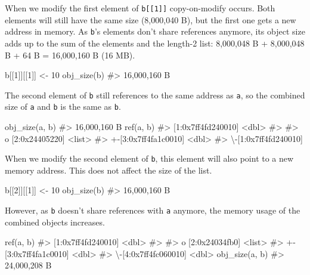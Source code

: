\documentclass[
]{krantz}
\makeatletter
\newenvironment{Shaded}{\begin{snugshade}}{\end{snugshade}}
\newcommand{\CommentTok}[1]{\textcolor[rgb]{0.56,0.35,0.01}{\textit{#1}}}
\newcommand{\DecValTok}[1]{\textcolor[rgb]{0.00,0.00,0.81}{#1}}
\newcommand{\KeywordTok}[1]{\textcolor[rgb]{0.13,0.29,0.53}{\textbf{#1}}}
\newcommand{\NormalTok}[1]{#1}
\newcommand{\StringTok}[1]{\textcolor[rgb]{0.31,0.60,0.02}{#1}}
\newenvironment{kframe}{%
\medskip{}
\setlength{\fboxsep}{.8em}
 \def\at@end@of@kframe{}%
 \ifinner\ifhmode%
  \def\at@end@of@kframe{\end{minipage}}%
  \begin{minipage}{\columnwidth}%
 \fi\fi%
 \def\FrameCommand##1{\hskip\@totalleftmargin \hskip-\fboxsep
 \colorbox{shadecolor}{##1}\hskip-\fboxsep
     \hskip-\linewidth \hskip-\@totalleftmargin \hskip\columnwidth}%
 \MakeFramed {\advance\hsize-\width
   \@totalleftmargin\z@ \linewidth\hsize
   \@setminipage}}%
 {\par\unskip\endMakeFramed%
 \at@end@of@kframe}
\renewenvironment{Shaded}{\begin{kframe}}{\end{kframe}}
\renewcommand{\KeywordTok} [1]{\textcolor[rgb]{0.00,0.44,0.13}{{#1}}}
\renewcommand{\DecValTok}  [1]{\textcolor[rgb]{0.25,0.63,0.44}{{#1}}}
\renewcommand{\StringTok}  [1]{\textcolor[rgb]{0.25,0.44,0.63}{{#1}}}
\renewcommand{\CommentTok} [1]{\textcolor[rgb]{0.38,0.63,0.69}{{#1}}}
\renewcommand{\NormalTok}  [1]{{#1}}
\makeatother
\begin{document}
When we modify the first element of \texttt{b{[}{[}1{]}{]}} copy-on-modify occurs. Both elements will still have the same size (8,000,040 B), but the first one gets a new address in memory. As \texttt{b}'s elements don't share references anymore, its object size adds up to the sum of the elements and the length-2 list: 8,000,048 B + 8,000,048 B + 64 B = 16,000,160 B (16 MB).

\begin{Shaded}
\begin{Highlighting}[]
\NormalTok{b[[}\DecValTok{1}\NormalTok{]][[}\DecValTok{1}\NormalTok{]] <-}\StringTok{ }\DecValTok{10}
\KeywordTok{obj_size}\NormalTok{(b)}
\CommentTok{#> 16,000,160 B}
\end{Highlighting}
\end{Shaded}

The second element of \texttt{b} still references to the same address as \texttt{a}, so the combined size of \texttt{a} and \texttt{b} is the same as \texttt{b}.

\begin{Shaded}
\begin{Highlighting}[]
\KeywordTok{obj_size}\NormalTok{(a, b) }
\CommentTok{#> 16,000,160 B}
\KeywordTok{ref}\NormalTok{(a, b)}
\CommentTok{#> [1:0x7ff4fd240010] <dbl> }
\CommentTok{#>  }
\CommentTok{#> o [2:0x24405220] <list> }
\CommentTok{#> +-[3:0x7ff4fa1c0010] <dbl> }
\CommentTok{#> \textbackslash{}-[1:0x7ff4fd240010]}
\end{Highlighting}
\end{Shaded}

When we modify the second element of \texttt{b}, this element will also point to a new memory address. This does not affect the size of the list.

\begin{Shaded}
\begin{Highlighting}[]
\NormalTok{b[[}\DecValTok{2}\NormalTok{]][[}\DecValTok{1}\NormalTok{]] <-}\StringTok{ }\DecValTok{10}
\KeywordTok{obj_size}\NormalTok{(b) }
\CommentTok{#> 16,000,160 B}
\end{Highlighting}
\end{Shaded}

However, as \texttt{b} doesn't share references with \texttt{a} anymore, the memory usage of the combined objects increases.

\begin{Shaded}
\begin{Highlighting}[]
\KeywordTok{ref}\NormalTok{(a, b)}
\CommentTok{#> [1:0x7ff4fd240010] <dbl> }
\CommentTok{#>  }
\CommentTok{#> o [2:0x24034fb0] <list> }
\CommentTok{#> +-[3:0x7ff4fa1c0010] <dbl> }
\CommentTok{#> \textbackslash{}-[4:0x7ff4fc060010] <dbl>}
\KeywordTok{obj_size}\NormalTok{(a, b) }
\CommentTok{#> 24,000,208 B}
\end{Highlighting}
\end{Shaded}
\end{document}
